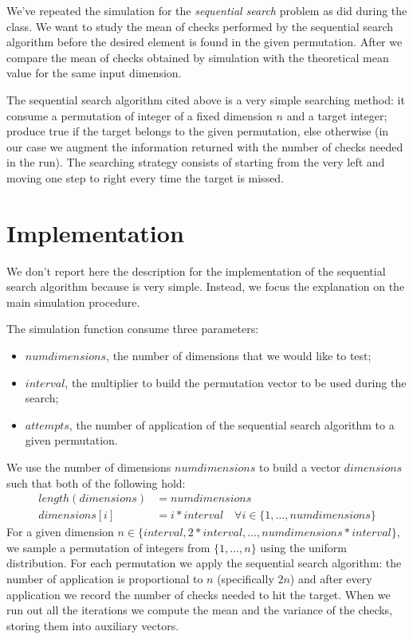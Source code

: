 We've repeated the simulation for the \emph{sequential search} problem
as did during the class. We want to study the mean of checks performed
by the sequential search algorithm before the desired element is found
in the given permutation. After we compare the mean of checks obtained
by simulation with the theoretical mean value for the same input
dimension.

The sequential search algorithm cited above is a very simple searching
method: it consume a permutation of integer of a fixed dimension $n$
and a target integer; produce true if the target belongs to the given
permutation, else otherwise (in our case we augment the information
returned with the number of checks needed in the run). The searching
strategy consists of starting from the very left and moving one step
to right every time the target is missed.

\section{Implementation}

We don't report here the description for the implementation of the
sequential search algorithm because is very simple. Instead, we focus
the explanation on the main simulation procedure.

The simulation function consume three parameters:
\begin{itemize}
\item $numdimensions$, the number of dimensions that we would like to
  test;
\item $interval$, the multiplier to build the permutation vector to be
  used during the search;
\item $attempts$, the number of application of the sequential search
  algorithm to a given permutation.
\end{itemize}
We use the number of dimensions $numdimensions$ to build a vector
$dimensions$ such that both of the following hold:
\begin{displaymath}
  \begin{split}
    length(dimensions)&=numdimensions \\
    dimensions[i]&=i * interval \quad \forall i \in \{1,\ldots,numdimensions\}
  \end{split}
\end{displaymath}
For a given dimension $n \in \{interval, 2*interval,
\ldots,numdimensions*interval\}$, we sample a permutation of integers
from $\{1,\ldots,n\}$ using the uniform distribution. For each
permutation we apply the sequential search algorithm: the number of
application is proportional to $n$ (specifically $2n$) and after every
application we record the number of checks needed to hit the target.
When we run out all the iterations we compute the mean and the
variance of the checks, storing them into auxiliary vectors.

